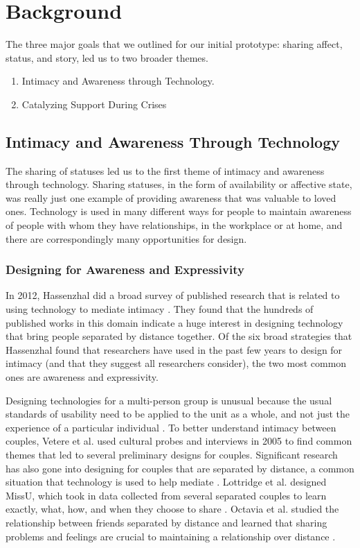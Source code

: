 \chapter{Background}
  The three major goals that we outlined for our initial prototype:
  sharing affect, status, and story, led us to two broader themes.
  \begin{enumerate}
  \item Intimacy and Awareness through Technology.
  \item Catalyzing Support During Crises
  \end{enumerate}

\section{Intimacy and Awareness Through Technology}
  The sharing of statuses led us to the first theme of
  intimacy and awareness through technology.
  Sharing statuses,
  in the form of availability or affective state,
  was really just one example of providing awareness that was valuable to loved ones.
  Technology is used in many different ways for people to maintain
  awareness of people with whom they have relationships,
  in the workplace or at home,
  and there are correspondingly many opportunities for design.

  \subsection{Designing for Awareness and Expressivity}
    In 2012, Hassenzhal did a broad survey of published research
    that is related to using technology to mediate intimacy
    \cite{hassenzhal12}.
    They found that the hundreds of published works in this domain indicate a
    huge interest in designing technology that bring people separated by distance together.
    Of the six broad strategies that Hassenzhal found
    that researchers have used in the past few years to design for intimacy
    (and that they suggest all researchers consider),
    the two most common ones are awareness and expressivity.

    Designing technologies for a multi-person group is unusual because the usual
    standards of usability need to be applied to the unit as a whole, and not just
    the experience of a particular individual \cite{neustaedter12}.
    To better understand intimacy between couples,
    Vetere et al. used cultural probes and interviews in 2005 to find
    common themes that led to several preliminary designs for couples.
    Significant research has also gone into designing for couples that are
    separated by distance,
    a common situation that technology is used to help mediate
    \cite{vetere05}.
    Lottridge et al. designed MissU, which took in data collected from several separated couples
    to learn exactly, what, how, and when they choose to share
    \cite{lottridge09}.
    Octavia et al. studied the relationship between friends separated by distance
    and learned that sharing problems and feelings are crucial to
    maintaining a relationship over distance
    \cite{octavia07}.

